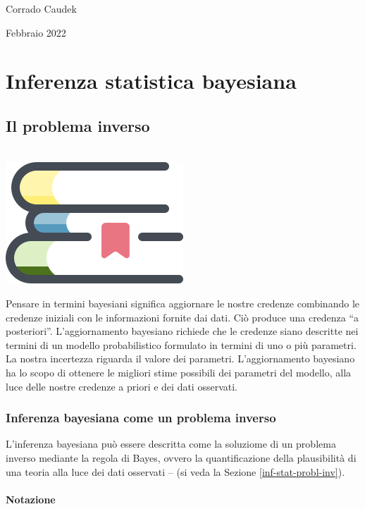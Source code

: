 \documentclass[
  10pt,
  italian,
  a4paper,
  extrafontsizes,onecolumn,openright
  ]{memoir}
\newenvironment{mdframedwithfootChapterintro}
{   
    \savenotes
    \begin{mdframed}[%
    topline=true, bottomline=true, linecolor=oiB, linewidth=1.4pt,
    rightline=false, leftline=false,
    backgroundcolor=oiLB]
    \renewcommand{\thempfootnote}{\arabic{footnote}}
    }
{
    \end{mdframed}
    \spewnotes
}
\newenvironment{chapterintro}{
\vspace{4mm}
\begin{mdframedwithfootChapterintro}
\begin{minipage}[t]{0.10\textwidth}
{$\:$ \\ \setkeys{Gin}{width=2.5em,keepaspectratio}\includegraphics{images/_icons/chapterintro.png}}
\end{minipage}
\hfill
\begin{minipage}[t]{0.90\textwidth}
\setlength{\parskip}{1em}
\large
}{\end{minipage}
\end{mdframedwithfootChapterintro}
\vspace{4mm}
}
\begin{document}
\bigskip

Corrado Caudek

\bigskip

Febbraio 2022

\mainmatter

\hypertarget{part-inferenza-statistica-bayesiana}{%
\part*{Inferenza statistica bayesiana}\label{part-inferenza-statistica-bayesiana}}

\hypertarget{chapter-intro-bayes-inference}{%
\chapter{Il problema inverso}\label{chapter-intro-bayes-inference}}

\begin{chapterintro}
Pensare in termini bayesiani significa aggiornare le nostre credenze combinando le credenze iniziali con le informazioni fornite dai dati. Ciò produce una credenza ``a posteriori''. L'aggiornamento bayesiano richiede che le credenze siano descritte nei termini di un modello probabilistico formulato in termini di uno o più parametri. La nostra incertezza riguarda il valore dei parametri. L'aggiornamento bayesiano ha lo scopo di ottenere le migliori stime possibili dei parametri del modello, alla luce delle nostre credenze a priori e dei dati osservati.

\end{chapterintro}

\hypertarget{inferenza-bayesiana-come-un-problema-inverso}{%
\section{Inferenza bayesiana come un problema inverso}\label{inferenza-bayesiana-come-un-problema-inverso}}

L'inferenza bayesiana può essere descritta come la soluziome di un problema inverso mediante la regola di Bayes, ovvero la quantificazione della plausibilità di una teoria alla luce dei dati osservati -- (si veda la Sezione \ref{inf-stat-probl-inv}).

\hypertarget{notazione}{%
\subsection{Notazione}\label{notazione}}
\end{document}
